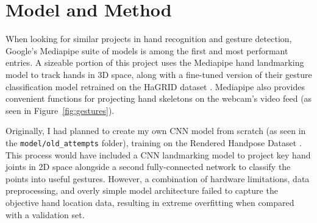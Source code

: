 \documentclass{article}
\begin{document}
\section{Model and Method}
When looking for similar projects in hand recognition and gesture detection, Google's Mediapipe suite of models \cite{gesture_recognizer} is among the first and most performant entries. A sizeable portion of this project uses the Mediapipe hand landmarking model to track hands in 3D space, along with a fine-tuned version of their gesture classification model retrained on the HaGRID dataset \cite{Alexander_2024}. Mediapipe also provides convenient functions for projecting hand skeletons on the webcam's video feed (as seen in Figure~\ref{fig:gestures}).

Originally, I had planned to create my own CNN model from scratch (as seen in the \texttt{model/old\_attempts} folder), training on the Rendered Handpose Dataset \cite{zimmermann2017learningestimate3dhand}. This process would have included a CNN landmarking model to project key hand joints in 2D space alongside a second fully-connected network to classify the points into useful gestures. However, a combination of hardware limitations, data preprocessing, and overly simple model architecture failed to capture the objective hand location data, resulting in extreme overfitting when compared with a validation set.
\end{document}
